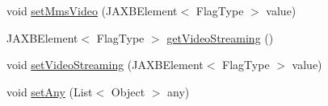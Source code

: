 \begin{DoxyCompactItemize}
\item 
void \hyperlink{classcom_1_1telefonica_1_1schemas_1_1unica_1_1rest_1_1directory_1_1v1_1_1UserTerminalInfoType_abccdc9e26b34cb484e442b0556a8531c}{setMmsVideo} (JAXBElement$<$ FlagType $>$ value)
\item 
JAXBElement$<$ FlagType $>$ \hyperlink{classcom_1_1telefonica_1_1schemas_1_1unica_1_1rest_1_1directory_1_1v1_1_1UserTerminalInfoType_a05fd8ce79b41bc714a9d4732dbbff301}{getVideoStreaming} ()
\item 
void \hyperlink{classcom_1_1telefonica_1_1schemas_1_1unica_1_1rest_1_1directory_1_1v1_1_1UserTerminalInfoType_aebe96fb42f7c04e8ca72e8c742e14761}{setVideoStreaming} (JAXBElement$<$ FlagType $>$ value)
\item 
void \hyperlink{classcom_1_1telefonica_1_1schemas_1_1unica_1_1rest_1_1directory_1_1v1_1_1UserTerminalInfoType_a3394b9e6b8ce2217b7975ce7313b89c7}{setAny} (List$<$ Object $>$ any)
\end{DoxyCompactItemize}
